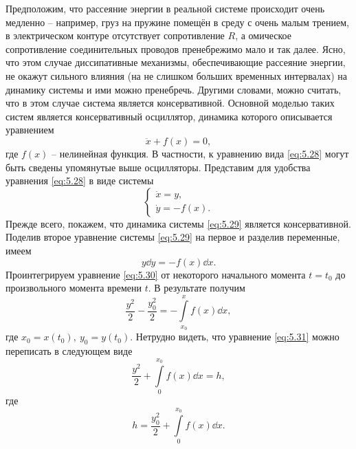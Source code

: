 Предположим, что рассеяние энергии в реальной системе происходит
очень медленно – например, груз на пружине помещён в среду с очень малым
трением, в электрическом контуре отсутствует сопротивление $R$, а омическое
сопротивление соединительных проводов пренебрежимо мало и так далее.
Ясно, что этом случае диссипативные механизмы, обеспечивающие рассеяние
энергии, не окажут сильного влияния (на не слишком больших временных
интервалах) на динамику системы и ими можно пренебречь. Другими словами,
можно считать, что в этом случае система является консервативной. Основной
моделью таких систем является консервативный осциллятор, динамика
которого описывается уравнением
\begin{equation}
        \label{eq:5.28}
        \ddot x + f(x) = 0,
\end{equation}
где $f(x)$ -- нелинейная функция. В частности, к уравнению вида \eqref{eq:5.28} могут быть сведены упомянутые выше осцилляторы. Представим для удобства уравнения \eqref{eq:5.28} в виде системы
\begin{equation}
        \label{eq:5.29}
        \begin{cases}
                \dot x = y, \\
                \dot y = -f(x).
        \end{cases}
\end{equation}
Прежде всего, покажем, что динамика системы \eqref{eq:5.29} является консервативной. Поделив второе уравнение системы \eqref{eq:5.29} на первое и разделив переменные, имеем
\begin{equation}
        \label{eq:5.30}
        y \dd{y} = - f(x) \dd{x}.
\end{equation}
Проинтегрируем уравнение \eqref{eq:5.30} от некоторого начального момента $t=t_0$ до произвольного момента времени $t$. В результате получим
\begin{equation}
        \label{eq:5.31}
        \frac{y^2}{2} - \frac{y_0^2}{2} = - \int\limits_{x_0}^{x} f(x) \dd{x}, 
\end{equation}
где $x_0 = x(t_0),~ y_0=y(t_0)$. Нетрудно видеть, что уравнение \eqref{eq:5.31} можно переписать в следующем виде
\begin{equation}
        \label{eq:5.32}
        \frac{y^2}{2} + \int\limits_{0}^{x_0} f(x) \dd{x} = h, 
\end{equation}
где
\begin{equation}
        \label{eq:5.33}
        h=\frac{y_0^2}{2} + \int\limits_{0}^{x_0}  f(x) \dd{x}.
\end{equation}
